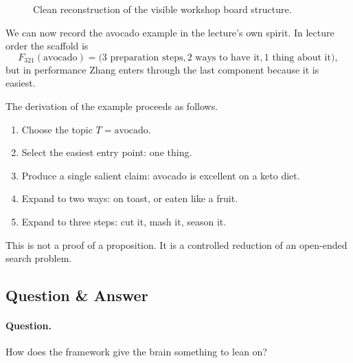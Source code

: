 \begin{figure}[h]
\centering
{}
\caption{Clean reconstruction of the visible workshop board structure.}
\end{figure}

We can now record the avocado example in the lecture’s own spirit. In lecture order the scaffold is
\begin{equation}
F_{321}(\text{avocado})
=
\bigl(
\text{3 preparation steps},
\text{2 ways to have it},
\text{1 thing about it}
\bigr),
\end{equation}
but in performance Zhang enters through the last component because it is easiest.

The derivation of the example proceeds as follows.
\begin{enumerate}
\item Choose the topic \(T=\text{avocado}\).
\item Select the easiest entry point: one thing.
\item Produce a single salient claim: avocado is excellent on a keto diet.
\item Expand to two ways: on toast, or eaten like a fruit.
\item Expand to three steps: cut it, mash it, season it.
\end{enumerate}
This is not a proof of a proposition. It is a controlled reduction of an open-ended search problem.

\subsection{Question \& Answer}

\paragraph{Question.} How does the framework give the brain something to lean on?


